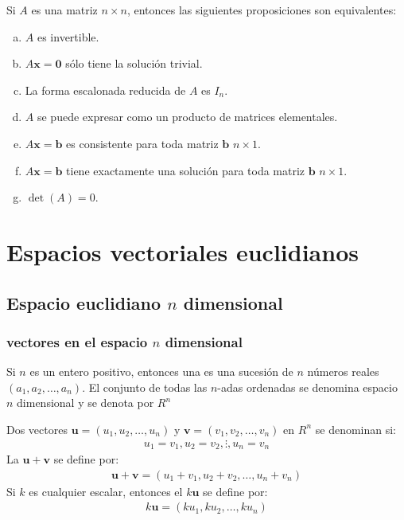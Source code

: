 \documentclass[a4paper,12pt]{article}
\begin{document}
\begin{theorem}
  Si $A$ es una matriz $n\times n$, entonces las siguientes proposiciones son
  equivalentes:
  \begin{enumerate}[(a)]
    \item $A$ es invertible.
    \item $A\mathbf{x}=\mathbf{0}$ sólo tiene la solución trivial.
    \item La forma escalonada reducida de $A$ es $I_n$.
    \item $A$ se puede expresar como un producto de matrices elementales.
    \item $A\mathbf{x}=\mathbf{b}$ es consistente para toda matriz
      $\mathbf{b}$ $n\times 1$.
    \item $A\mathbf{x}=\mathbf{b}$ tiene exactamente una solución para toda
      matriz $\mathbf{b}$ $n\times 1$.
    \item $\det(A)=0$.
  \end{enumerate}
  \label{theo:resumen_matriz_det}
\end{theorem}

\newpage

\section{Espacios vectoriales euclidianos}

\subsection{Espacio euclidiano $n$ dimensional}

\subsubsection{vectores en el espacio $n$ dimensional}

\begin{concept}
  Si $n$ es un entero positivo, entonces una  es una
  sucesión de $n$ números reales $(a_1,a_2,\ldots ,a_n)$. El conjunto de todas
  las $n$-adas ordenadas se denomina espacio $n$ dimensional y se denota por
  $R^n$
\end{concept}

\begin{concept}
  Dos vectores $\mathbf{u}=(u_1,u_2,\ldots,u_n)$ y
  $\mathbf{v}=(v_1,v_2,\ldots,v_n)$ en $R^n$ se denominan  si:
  \begin{align*}
    u_1=v_1, u_2=v_2,\vdots ,u_n=v_n
  \end{align*}
  La  $\mathbf{u}+\mathbf{v}$ se define por:
  \begin{align*}
    \mathbf{u}+\mathbf{v}=(u_1+v_1,u_2+v_2,\ldots,u_n+v_n)
  \end{align*}
  Si $k$ es cualquier escalar, entonces el  $k\mathbf{u}$
  se define por:
  \begin{align*}
    k\mathbf{u}=(ku_1,ku_2,\ldots,ku_n)
  \end{align*}
\end{concept}
\end{document}
